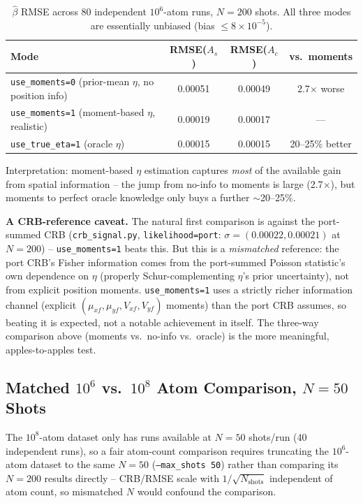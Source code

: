 \documentclass[11pt,a4paper]{article}
\begin{document}
\begin{table}[h]
\centering
\begin{tabular}{lccc}
\toprule
Mode & RMSE($A_s$) & RMSE($A_c$) & vs.\ moments \\
\midrule
\texttt{use\_moments=0} (prior-mean $\eta$, no position info) & 0.00051 & 0.00049 & 2.7$\times$ worse \\
\texttt{use\_moments=1} (moment-based $\eta$, realistic) & 0.00019 & 0.00017 & --- \\
\texttt{use\_true\_eta=1} (oracle $\eta$) & 0.00015 & 0.00015 & 20--25\% better \\
\bottomrule
\end{tabular}
\caption{$\hat\beta$ RMSE across 80 independent $10^6$-atom runs, $N=200$
shots. All three modes are essentially unbiased (bias $\le 8\times10^{-5}$).}
\end{table}

Interpretation: moment-based $\eta$ estimation captures \emph{most} of the
available gain from spatial information -- the jump from no-info to moments
is large (2.7$\times$), but moments to perfect oracle knowledge only buys a
further $\sim$20--25\%.

\textbf{A CRB-reference caveat.} The natural first comparison is against the
port-summed CRB (\texttt{crb\_signal.py}, \texttt{likelihood=port}:
$\sigma=(0.00022, 0.00021)$ at $N=200$) -- \texttt{use\_moments=1} beats
this. But this is a \emph{mismatched} reference: the port CRB's Fisher
information comes from the port-summed Poisson statistic's own dependence on
$\eta$ (properly Schur-complementing $\eta$'s prior uncertainty), not from
explicit position moments. \texttt{use\_moments=1} uses a strictly richer
information channel (explicit $(\mu_{xf},\mu_{yf},V_{xf},V_{yf})$ moments)
than the port CRB assumes, so beating it is expected, not a notable
achievement in itself. The three-way comparison above (moments vs.\ no-info
vs.\ oracle) is the more meaningful, apples-to-apples test.

\subsection{Matched $10^6$ vs.\ $10^8$ Atom Comparison, $N=50$ Shots}

The $10^8$-atom dataset only has runs available at $N=50$ shots/run (40
independent runs), so a fair atom-count comparison requires truncating the
$10^6$-atom dataset to the same $N=50$ (\texttt{--max\_shots 50}) rather than
comparing its $N{=}200$ results directly -- CRB/RMSE scale with
$1/\sqrt{N_\mathrm{shots}}$ independent of atom count, so mismatched $N$
would confound the comparison.
\end{document}
